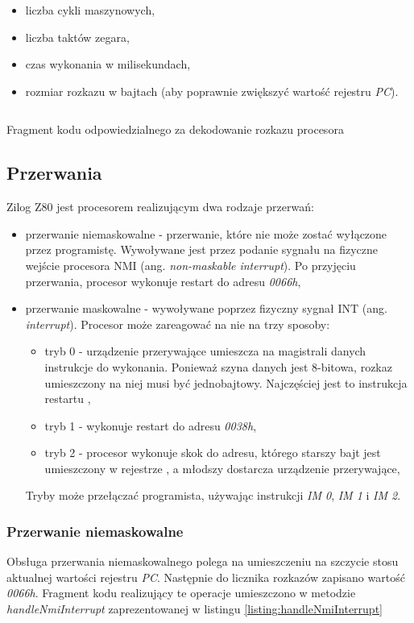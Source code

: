 \begin{itemize}  
    \item liczba cykli maszynowych,
    \item liczba taktów zegara,
    \item czas wykonania w milisekundach,
    \item rozmiar rozkazu w bajtach (aby poprawnie zwiększyć wartość rejestru \emph{PC}).
\end{itemize}

\begin{listing}[h]
	\inputminted{java}{listings/z80emu-core/exampleInstruction.java}
	\caption{Fragment kodu odpowiedzialnego za dekodowanie rozkazu procesora}
	\label{listing:exampleInstruction}
\end{listing}

\subsection{Przerwania}
Zilog Z80 jest procesorem realizującym dwa rodzaje przerwań:
\begin{itemize}  
    \item przerwanie niemaskowalne - przerwanie, które nie może zostać wyłączone przez programistę. Wywoływane jest przez podanie sygnału na fizyczne wejście procesora NMI (ang. \emph{non-maskable interrupt}). Po przyjęciu przerwania, procesor wykonuje restart do adresu \emph{0066h},
    \item przerwanie maskowalne - wywoływane poprzez fizyczny sygnał INT (ang. \emph{interrupt}). Procesor może zareagować na nie na trzy sposoby:
    \begin{itemize}
        \item tryb 0 - urządzenie przerywające umieszcza na magistrali danych instrukcje do wykonania. Ponieważ szyna danych jest 8-bitowa, rozkaz umieszczony na niej musi być jednobajtowy. Najczęściej jest to instrukcja restartu \cite{manual},
        \item tryb 1 - wykonuje restart do adresu \emph{0038h},
        \item tryb 2 - procesor wykonuje skok do adresu, którego starszy bajt jest umieszczony w rejestrze , a młodszy dostarcza urządzenie przerywające,
    \end{itemize}
    Tryby może przełączać programista, używając instrukcji \emph{IM 0}, \emph{IM 1} i \emph{IM 2}.
\end{itemize}

\subsubsection{Przerwanie niemaskowalne}
Obsługa przerwania niemaskowalnego polega na umieszczeniu na szczycie stosu aktualnej wartości rejestru \emph{PC}. Następnie do licznika rozkazów zapisano wartość \emph{0066h}. Fragment kodu realizujący te operacje umieszczono w metodzie \emph{handleNmiInterrupt} zaprezentowanej w listingu \ref{listing:handleNmiInterrupt}


